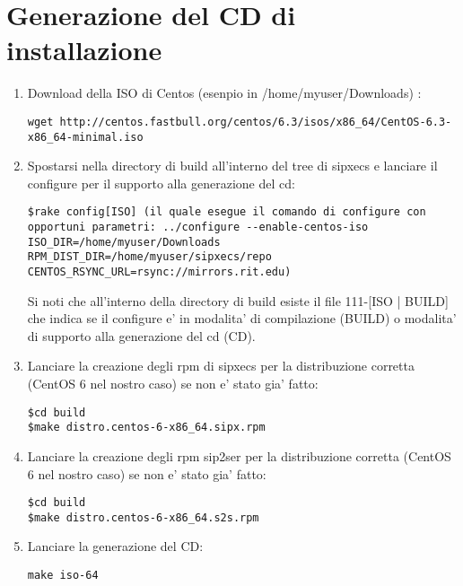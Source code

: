 \section{Generazione del CD di installazione}

\begin{enumerate}
\item Download della ISO di Centos (esenpio in /home/myuser/Downloads) : 
\begin{verbatim}
wget http://centos.fastbull.org/centos/6.3/isos/x86_64/CentOS-6.3-x86_64-minimal.iso
\end{verbatim}

\item Spostarsi nella directory di build all'interno del tree di sipxecs e  lanciare il configure per il supporto alla generazione del cd: 
\begin{verbatim}
$rake config[ISO] (il quale esegue il comando di configure con opportuni parametri: ../configure --enable-centos-iso ISO_DIR=/home/myuser/Downloads RPM_DIST_DIR=/home/myuser/sipxecs/repo CENTOS_RSYNC_URL=rsync://mirrors.rit.edu)
\end{verbatim}

Si noti che all'interno della directory di build esiste il file 111-[ISO | BUILD] che indica se il configure e' in modalita' di compilazione (BUILD) o modalita' di supporto alla generazione del cd (CD).

\item Lanciare la creazione degli rpm di sipxecs per la distribuzione corretta (CentOS 6 nel nostro caso) se non e' stato gia' fatto:
\begin{verbatim}
$cd build
$make distro.centos-6-x86_64.sipx.rpm
\end{verbatim}

\item Lanciare la creazione degli rpm sip2ser per la distribuzione corretta (CentOS 6 nel nostro caso) se non e' stato gia' fatto:
\begin{verbatim}
$cd build
$make distro.centos-6-x86_64.s2s.rpm
\end{verbatim}

\item Lanciare la generazione del CD: 
\begin{verbatim}
make iso-64
\end{verbatim}
\end{enumerate}